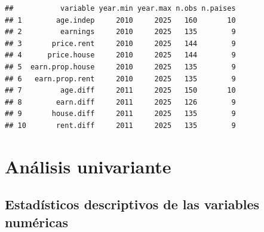 \documentclass[water,article,submit,pdftex,moreauthors]{Definitions/mdpi}
\begin{document}
\begin{verbatim}
##           variable year.min year.max n.obs n.paises
## 1        age.indep     2010     2025   160       10
## 2         earnings     2010     2025   135        9
## 3       price.rent     2010     2025   144        9
## 4      price.house     2010     2025   144        9
## 5  earn.prop.house     2010     2025   135        9
## 6   earn.prop.rent     2010     2025   135        9
## 7         age.diff     2011     2025   150       10
## 8        earn.diff     2011     2025   126        9
## 9       house.diff     2011     2025   135        9
## 10       rent.diff     2011     2025   135        9
\end{verbatim}

\section{Análisis univariante}\label{anuxe1lisis-univariante}

\subsection{Estadísticos descriptivos de las variables
numéricas}\label{estaduxedsticos-descriptivos-de-las-variables-numuxe9ricas}
\end{document}
